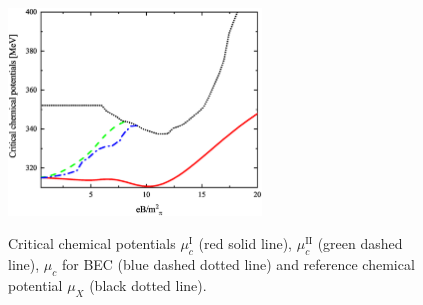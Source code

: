 \documentclass[prd, showpacs,nofootinbib,amsmath,amssymb,12pt]{revtex4}
\begin{document}
\begin{figure}[h]
  \caption{Critical chemical potentials $\mu_c^\text{I}$ (red solid line), $\mu_c^\text{II}$ (green dashed line), $\mu_c$ for BEC  (blue dashed dotted line)  and reference chemical potential $\mu_X$ (black dotted line).}
  \centering
    \includegraphics[width=0.6\textwidth]{third.eps}
    \label{fig:thirdpoint}
\end{figure}
\end{document}
